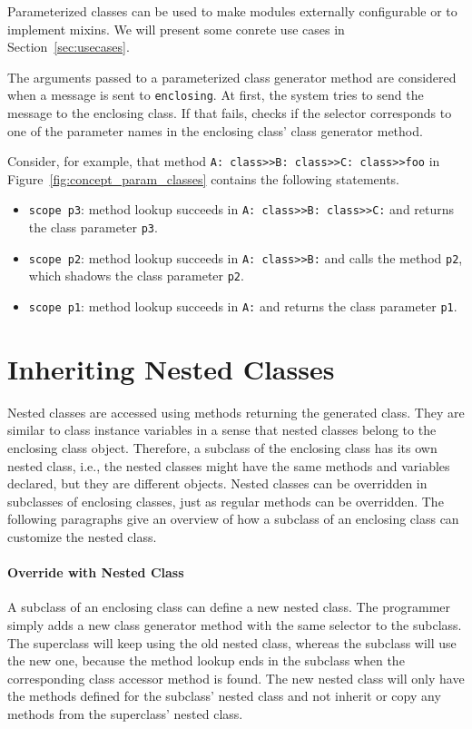 Parameterized classes can be used to make modules externally configurable or to implement mixins. We will present some conrete use cases in Section~\ref{sec:usecases}.

The arguments passed to a parameterized class generator method are considered when a message is sent to \texttt{enclosing}. At first, the system tries to send the message to the enclosing class. If that fails, \msname checks if the selector corresponds to one of the parameter names in the enclosing class' class generator method.

Consider, for example, that method \texttt{A: class>>B: class>>C: class>>foo} in Figure~\ref{fig:concept_param_classes} contains the following statements.
\begin{itemize}
	\item \texttt{scope p3}: method lookup succeeds in \texttt{A: class>>B: class>>C:} and returns the class parameter \texttt{p3}.
	\item \texttt{scope p2}: method lookup succeeds in \texttt{A: class>>B:} and calls the method \texttt{p2}, which shadows the class parameter \texttt{p2}.
	\item \texttt{scope p1}: method lookup succeeds in \texttt{A:} and returns the class parameter \texttt{p1}.
\end{itemize}

\section{Inheriting Nested Classes}
\label{sec:concept_inh_nested_cl}
Nested classes are accessed using methods returning the generated class. They are similar to class instance variables in a sense that nested classes belong to the enclosing class object. Therefore, a subclass of the enclosing class has its own nested class, i.e., the nested classes might have the same methods and variables declared, but they are different objects. Nested classes can be overridden in subclasses of enclosing classes, just as regular methods can be overridden. The following paragraphs give an overview of how a subclass of an enclosing class can customize the nested class.

\paragraph{Override with Nested Class}
A subclass of an enclosing class can define a new nested class. The programmer simply adds a new class generator method with the same selector to the subclass. The superclass will keep using the old nested class, whereas the subclass will use the new one, because the method lookup ends in the subclass when the corresponding class accessor method is found. The new nested class will only have the methods defined for the subclass' nested class and not inherit or copy any methods from the superclass' nested class.

